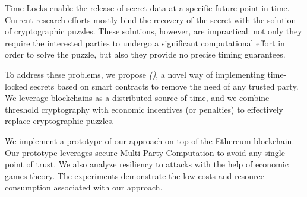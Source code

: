 Time-Locks enable the release of secret data at a specific future point in time.
Current research efforts mostly bind the recovery of the secret with the solution of cryptographic puzzles.
These solutions, however, are  impractical: 
not only they require the interested parties to undergo a significant computational effort in order to solve the puzzle, but also they provide no precise timing guarantees.

To address these problems, we propose {\em \name (\shortname)}, a novel way of implementing time-locked secrets based on smart contracts to remove the need of any trusted party.
We leverage blockchains as a distributed source of time, and we combine threshold cryptography with economic incentives (or penalties) to effectively replace cryptographic puzzles.


We implement a prototype of our approach on top of the Ethereum blockchain. Our prototype leverages secure Multi-Party Computation to avoid any single point of trust.
We also analyze resiliency to attacks with the help of economic games theory.
The experiments demonstrate the low costs and resource consumption associated with our approach.  
